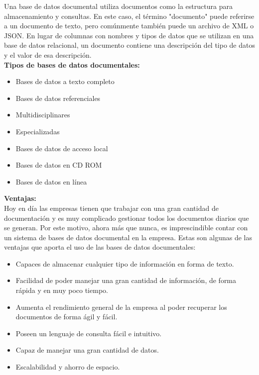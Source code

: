 \documentclass[twoside,twocolumn]{article}
\begin{document}
Una base de datos documental utiliza documentos como la estructura para almacenamiento y consultas. En este caso, el término "documento" puede referirse a un documento de texto, pero comúnmente también puede un archivo de XML o JSON. En lugar de columnas con nombres y tipos de datos que se utilizan en una base de datos relacional, un documento contiene una descripción del tipo de datos y el valor de esa descripción.
\\
	\textbf{Tipos de bases de datos documentales:}
\begin{itemize}	

	\item Bases de datos a texto completo
	\item Bases de datos referenciales
	\item Multidisciplinares
	\item Especializadas
	\item Bases de datos de acceso local
	\item Bases de datos en CD ROM
\item Bases de datos en línea
\end{itemize} 

	\textbf{Ventajas:}
\\
Hoy en día las empresas tienen que trabajar con una gran cantidad de documentación y es muy complicado gestionar todos los documentos diarios que se generan. Por este motivo, ahora más que nunca, es imprescindible contar con un sistema de bases de datos documental en la empresa. Estas son algunas de las ventajas que aporta el uso de las bases de datos documentales:
\begin{itemize}	

	\item Capaces de almacenar cualquier tipo de información en forma de texto.
	\item Facilidad de poder manejar una gran cantidad de información, de forma rápida y en muy poco tiempo.
	\item Aumenta el rendimiento general de la empresa al poder recuperar los documentos de forma ágil y fácil.
	\item Poseen un lenguaje de consulta fácil e intuitivo.
	\item Capaz de manejar una gran cantidad de datos.
	\item Escalabilidad y ahorro de espacio.

\end{itemize} 
\end{document}
